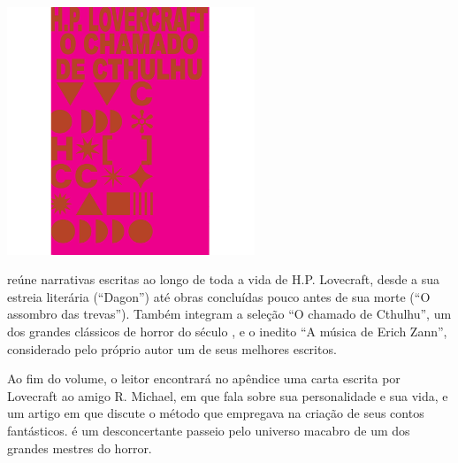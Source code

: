 \hspace*{-.4cm}\begin{minipage}[c]{.5\linewidth}
\small{
{}}
\end{minipage}



\pagebreak


\begin{center}
\hspace*{.5cm}\includegraphics[width=74mm]{./grid/lovecraft.jpg}
\end{center}

\hspace*{-7cm}\hrulefill\hspace*{-7cm}

\medskip

 reúne narrativas escritas ao longo de toda a vida de H.P. Lovecraft, desde a sua estreia literária (“Dagon”) até obras concluídas pouco antes de sua morte (“O assombro das trevas”). Também integram a seleção
“O chamado de Cthulhu”, um dos grandes clássicos de horror do século , e o inedito “A música de Erich Zann”, considerado pelo próprio autor um de seus melhores escritos.

Ao fim do volume, o leitor encontrará no apêndice uma carta escrita por
Lovecraft ao amigo R. Michael, em que fala sobre sua personalidade e sua vida, e um artigo em que discute o método que empregava na criação de seus contos fantásticos. {} é um desconcertante passeio pelo universo macabro de um dos grandes mestres do horror.

